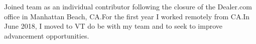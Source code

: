 \begin{cvparagraph}
Joined team as an individual contributor following the closure of the
Dealer.com office in Manhattan Beach, CA.\@ For the first year I worked
remotely from CA.\@ In June 2018, I moved to VT do be with my team and
to seek to improve advancement opportunities.
\end{cvparagraph}

\vspace{-1.00mm}


